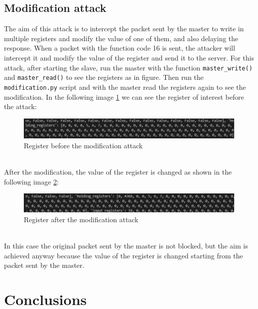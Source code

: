 \documentclass[12pt]{article}
\begin{document}
\subsection{Modification attack}
The aim of this attack is to intercept the packet sent by the master to write in multiple registers 
and modify the value of one of them, and also delaying the response.
When a packet with the function code 16 is sent, the attacker will intercept it and modify 
the value of the register and send it to the server.
For this attack, after starting the slave, run the master with the function \texttt{master\_write()} and \texttt{master\_read()} 
to see the registers as in figure. Then run the \texttt{modification.py} script and with the master 
read the registers again to see the modification.
In the following image \ref{fig:beforeModification} we can see the register of 
interest before the attack:
\begin{figure}[h]
    \centering
    \includegraphics[width=1\textwidth]{images/BeforeModification.png}
    \caption{Register before the modification attack}
    \label{fig:beforeModification}
\end{figure} \\
After the modification, the value of the register is changed as shown in the 
following image \ref{fig:afterModification}:
\begin{figure}[h]
    \centering
    \includegraphics[width=1\textwidth]{images/AfterModification.png}
    \caption{Register after the modification attack}
    \label{fig:afterModification}
\end{figure} \\
In this case the original packet sent by the master is not blocked, but the aim is achieved anyway 
because the value of the register is changed starting from the packet sent by the master.
\section{Conclusions}
\printbibliography 
\end{document}
